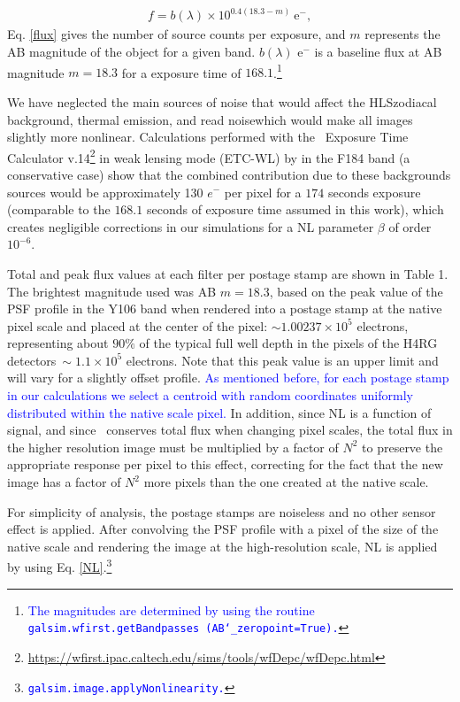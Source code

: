 \documentclass[preprint]{aastex}
\begin{document}
\begin{align}
f=b(\lambda)\times10^{0.4 (18.3-m)} \ \mathrm{e^-}, 
\label{flux}
\end{align}
Eq. \ref{flux} gives the number of source counts per exposure, and $m$ represents the AB magnitude of the object for a given band. $b(\lambda)$ e$^{-}$ is a baseline flux at AB magnitude $m=18.3$ for a exposure time of $168.1$.\footnote{\textcolor{blue}{ The magnitudes are determined by using the routine {\tt{galsim.wfirst.getBandpasses (AB\char`_zeropoint=True).}}}}

We have neglected the main sources of noise that would affect the HLS\textemdash zodiacal background, thermal emission, and read noise\textemdash which would make all images slightly more nonlinear. Calculations performed with the \wfa\ Exposure Time Calculator v.14\footnote{\url{https://wfirst.ipac.caltech.edu/sims/tools/wfDepc/wfDepc.html}} \citep{hirata12} in weak lensing mode (ETC-WL) by \citealt{spergel15} in the F184 band (a conservative case) show that the combined contribution due to these backgrounds sources would be approximately 130 $e^-$ per pixel for a $174$ seconds exposure (comparable to the $168.1$ seconds of exposure time assumed in this work), which creates negligible corrections in our simulations for a NL parameter $\beta$ of order $10^{-6}$.

Total and peak flux values at each filter per postage stamp are shown in Table 1. The brightest magnitude used was AB $m=18.3$, based on the peak value of the PSF profile in the Y106 band when rendered into a postage stamp at the native pixel scale and placed at the center of the pixel: $\sim 1.00237\times10^{5}$ electrons, representing about $90\%$ of the typical full well depth in the pixels of the H4RG detectors\textemdash$\ \sim1.1\times10^{5}$ electrons. Note that this peak value is an upper limit and will vary for a slightly offset profile. \textcolor{blue}{As mentioned before, for each postage stamp in our calculations we select a centroid with random coordinates uniformly distributed within the native scale pixel.} In addition, since NL is a function of signal, and since \gs\ conserves total flux when changing pixel scales, the total flux in the higher resolution image must be multiplied by a factor of $N^2$ to preserve the appropriate response per pixel to this effect, correcting for the fact that the new image has a factor of $N^2$ more pixels than the one created at the native scale. 

For simplicity of analysis, the postage stamps are noiseless and no other sensor effect is applied. After convolving the PSF profile with a pixel of the size of the native scale and rendering the image at the high-resolution scale, NL is applied by using Eq. \ref{NL}.\footnote{\textcolor{blue} {\tt{galsim.image.applyNonlinearity.}}}
\end{document}
